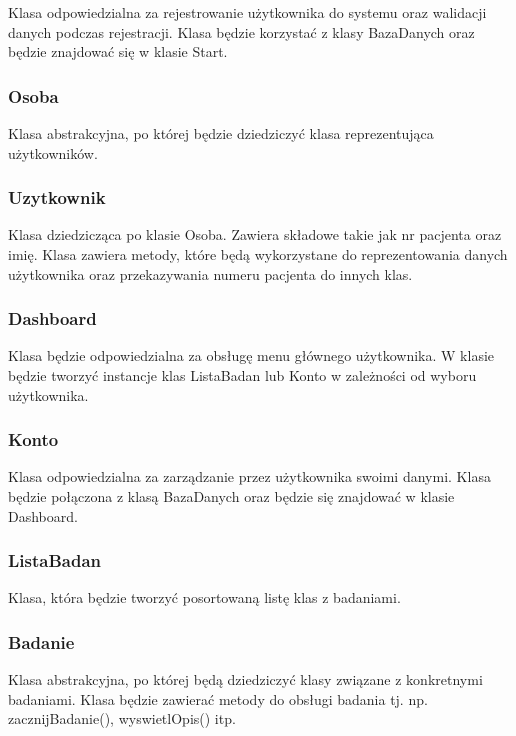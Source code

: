 \documentclass[12pt, letterpaper]{article}
\begin{document}
		Klasa odpowiedzialna za rejestrowanie użytkownika do systemu oraz walidacji danych podczas rejestracji. Klasa będzie korzystać z klasy BazaDanych oraz będzie znajdować się w klasie Start. 
		
		\subsubsection{Osoba}
		
		Klasa abstrakcyjna, po której będzie dziedziczyć klasa reprezentująca użytkowników.
		
		\subsubsection{Uzytkownik}
		
		Klasa dziedzicząca po klasie Osoba. Zawiera składowe takie jak nr pacjenta oraz imię. Klasa zawiera metody, które będą wykorzystane do reprezentowania danych użytkownika oraz przekazywania numeru pacjenta do innych klas.
		
		\subsubsection{Dashboard}
		
		Klasa będzie odpowiedzialna za obsługę menu głównego użytkownika. W klasie będzie tworzyć instancje klas ListaBadan lub Konto w zależności od wyboru użytkownika.
		
		\subsubsection{Konto}
		
		Klasa odpowiedzialna za zarządzanie przez użytkownika swoimi danymi. Klasa będzie połączona z klasą BazaDanych oraz będzie się znajdować w klasie Dashboard.
		
		\subsubsection{ListaBadan}
		
		Klasa, która będzie tworzyć posortowaną listę klas z badaniami.
		
		\subsubsection{Badanie}
		
		Klasa abstrakcyjna, po której będą dziedziczyć klasy związane z konkretnymi badaniami. Klasa będzie zawierać metody do obsługi badania tj. np. zacznijBadanie(), wyswietlOpis() itp.
		
\end{document}
